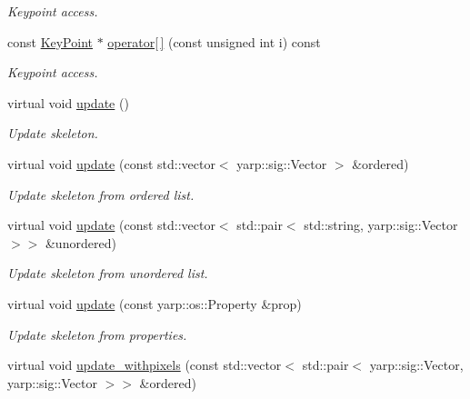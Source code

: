 \begin{DoxyCompactItemize}
\begin{DoxyCompactList}\small\item\em Keypoint access. \end{DoxyCompactList}\item 
const \mbox{\hyperlink{classassistive__rehab_1_1KeyPoint}{Key\+Point}} $\ast$ \mbox{\hyperlink{classassistive__rehab_1_1Skeleton_a0692ab89f16b0914b9ca9e0d4a07e52c}{operator\mbox{[}$\,$\mbox{]}}} (const unsigned int i) const
\begin{DoxyCompactList}\small\item\em Keypoint access. \end{DoxyCompactList}\item 
\mbox{\label{classassistive__rehab_1_1Skeleton_a1ba2ba229331f7966ff1bce10c776d99}} 
virtual void \mbox{\hyperlink{classassistive__rehab_1_1Skeleton_a1ba2ba229331f7966ff1bce10c776d99}{update}} ()
\begin{DoxyCompactList}\small\item\em Update skeleton. \end{DoxyCompactList}\item 
virtual void \mbox{\hyperlink{classassistive__rehab_1_1Skeleton_adbb387558eac21173b7c82cb43acd603}{update}} (const std\+::vector$<$ yarp\+::sig\+::\+Vector $>$ \&ordered)
\begin{DoxyCompactList}\small\item\em Update skeleton from ordered list. \end{DoxyCompactList}\item 
virtual void \mbox{\hyperlink{classassistive__rehab_1_1Skeleton_ab9642d6621d0a2b189c020f4d7695b14}{update}} (const std\+::vector$<$ std\+::pair$<$ std\+::string, yarp\+::sig\+::\+Vector $>$$>$ \&unordered)
\begin{DoxyCompactList}\small\item\em Update skeleton from unordered list. \end{DoxyCompactList}\item 
virtual void \mbox{\hyperlink{classassistive__rehab_1_1Skeleton_ae3346b2f363e1812fdc88e59d1f7bf7d}{update}} (const yarp\+::os\+::\+Property \&prop)
\begin{DoxyCompactList}\small\item\em Update skeleton from properties. \end{DoxyCompactList}\item 
virtual void \mbox{\hyperlink{classassistive__rehab_1_1Skeleton_a20d9eb5aecd6dccfa7e049bb932a6cef}{update\+\_\+withpixels}} (const std\+::vector$<$ std\+::pair$<$ yarp\+::sig\+::\+Vector, yarp\+::sig\+::\+Vector $>$$>$ \&ordered)

\end{DoxyCompactItemize}
